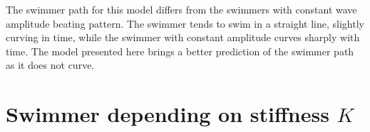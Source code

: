 The swimmer path for this model differs from the swimmers with constant wave amplitude beating pattern. The swimmer tends to swim in a straight line, slightly curving in time, while
the swimmer with constant amplitude curves sharply with time. The model presented here brings a better prediction of the swimmer path as it does not curve.


\section{Swimmer depending on stiffness $K$}
\label{sec:section 5}



\begin{figure}[H]
\centering
  \begin{footnotesize}
  
  \caption[]{}
   \label{fig:Bild4.17}
  \end{footnotesize}
\end{figure}



\begin{figure}[H]
\centering
  \begin{footnotesize}
  
  \caption[]{}
   \label{fig:Bild4.18}
  \end{footnotesize}
\end{figure}


\begin{figure}[H]
\centering
  \begin{footnotesize}
  
  \caption[]{}
   \label{fig:Bild4.19}
  \end{footnotesize}
\end{figure}

\begin{figure}[H]
\centering
  \begin{footnotesize}
  
  \caption[]{}
   \label{fig:Bild4.20}
  \end{footnotesize}
\end{figure}


\begin{figure}[H]
\centering
  \begin{footnotesize}
  
  \caption[]{}
   \label{fig:Bild4.x}
  \end{footnotesize}
\end{figure}

\begin{figure}[H]
\centering
  \begin{footnotesize}
  
  \caption[]{}
   \label{fig:Bild4.xx}
  \end{footnotesize}
\end{figure}



